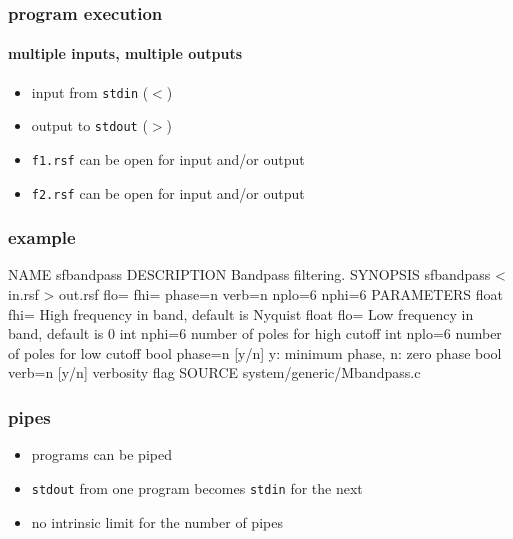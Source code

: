 \begin{frame} \frametitle{program execution}
  \framesubtitle{multiple inputs, multiple outputs}


  \begin{itemize}
  \item input from \texttt{stdin} ($<$)
  \item output to \texttt{stdout} ($>$)
  \item \texttt{f1.rsf} can be open for input and/or output
  \item \texttt{f2.rsf} can be open for input and/or output
  \end{itemize}

\end{frame}
\cwpnote{}

\begin{frame}[fragile] \frametitle{example}


\tiny
\begin{semiverbatim}
NAME
        sfbandpass
DESCRIPTION
        Bandpass filtering.
SYNOPSIS
        sfbandpass < in.rsf > out.rsf flo= fhi= phase=n verb=n nplo=6 nphi=6
PARAMETERS
        float   fhi=    High frequency in band, default is Nyquist
        float   flo=    Low frequency in band, default is 0
        int     nphi=6  number of poles for high cutoff
        int     nplo=6  number of poles for low cutoff
        bool    phase=n [y/n]   y: minimum phase, n: zero phase
        bool    verb=n [y/n]    verbosity flag
SOURCE
        system/generic/Mbandpass.c
\end{semiverbatim}
\end{frame}
\cwpnote{}

\begin{frame} \frametitle{pipes}

  \begin{itemize}
  \item \mg programs can be piped
  \item \texttt{stdout} from one program becomes \texttt{stdin} for the next
  \item no intrinsic limit for the number of pipes
  \end{itemize}

\end{frame}
\cwpnote{}

